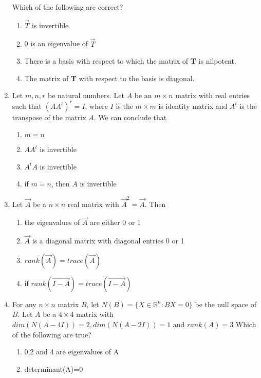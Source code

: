 \begin{enumerate}[label=\thesection.\arabic*.,ref=\thesection.\theenumi]
Which of the following are correct?\\
\begin{enumerate}
\item $\vec{T}$ is invertible
\item 0 is an eigenvalue of $\vec{T}$
\item There is a basis with respect to which the matrix of \textbf{T} is nilpotent.
\item The matrix of \textbf{T} with respect to the basis  is diagonal.
\end{enumerate}
\solution

\item Let $m,n,r$ be natural numbers. Let $A$ be an $m\times n$ matrix with real entries such that $(AA^t)^r = I$, where $I$ is the $m \times m$ is identity matrix and $A^t$ is the transpose of the matrix $A$. We can conclude that\\
\begin{enumerate}
\item
$m = n$\\
\item
$AA^t$ is invertible\\
\item
$A^tA$ is invertible\\
\item
if $m=n$, then $A$ is invertible
\end{enumerate}
%
\solution

\item Let $\vec{A}$ be a $n\times n$ real matrix with $\vec{A}^2=\vec{A}$. Then
\begin{enumerate}
	\item the eigenvalues of $\vec{A}$ are either 0 or 1
	\item $\vec{A}$ is a diagonal matrix with diagonal entries 0 or 1
	\item $rank(\vec{A})=trace(\vec{A})$
	\item if $rank(\vec{I-A})=trace(\vec{I-A})$
\end{enumerate}
%
%
\solution

\item For any $n\times n$ matrix $B$, let $N(B)=\{X\in \mathbb{R}^n:BX=0\}$ be the null space of $B$. Let $A$ be a $4\times 4$ matrix with $dim(N(A-4I))=2, dim(N(A-2I))=1$ and $rank(A)=3$
Which of the following are true?
\begin{enumerate}
\item 0,2 and 4 are eigenvalues of A
\item determinant(A)=0

\end{enumerate}
\end{enumerate}
